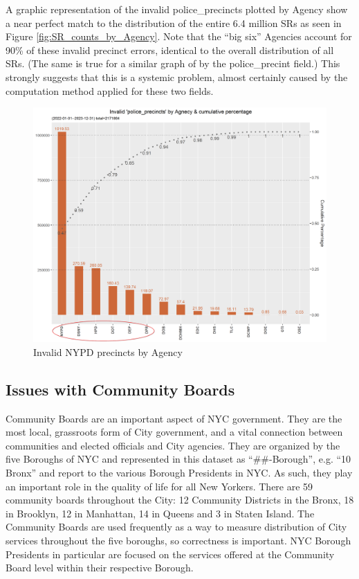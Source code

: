\documentclass[12pt, titlepage]{article}
\begin{document}
	A graphic representation of the invalid police\_precincts plotted by Agency show a near perfect match to the
	distribution of the entire 6.4 million SRs as seen in Figure \ref{fig:SR_counts_by_Agency}. Note that the ``big six'' Agencies account for 90\% of these invalid precinct errors, identical
	to the overall distribution of all SRs. (The same is true for a similar graph of by the police\_precint field.) This strongly suggests that this is a systemic problem, almost certainly caused by the computation method applied for these two fields.
	 
	\begin{figure}[H]
	  \centering
		  \includegraphics[width=\textwidth]{invalid_police_precincts.png}
		  \caption{Invalid NYPD precincts by Agency}
		  \label{fig:invalid_police_precincts_zip}
	\end{figure}

	\subsection{Issues with Community Boards}
	Community Boards are an important aspect of NYC government. They are the most local, grassroots form of City government, 
	and a vital connection between communities and elected officials and City agencies. They are organized by the five Boroughs of NYC and represented
	in this dataset as ``\#\#-Borough'', e.g. ``10 Bronx'' and report to the various Borough Presidents in NYC. As such, they play an important role in the quality of life for all New Yorkers.
	There are 59 community boards throughout the City: 12 Community Districts in the Bronx, 18 in Brooklyn, 12 in Manhattan, 14 in Queens and 3 in Staten Island.
	The Community Boards are used frequently as a way to measure distribution of City services throughout the five boroughs, so correctness is important. 
	NYC Borough Presidents in particular are focused on the services offered at the Community Board level within their respective Borough.
	
\end{document}
